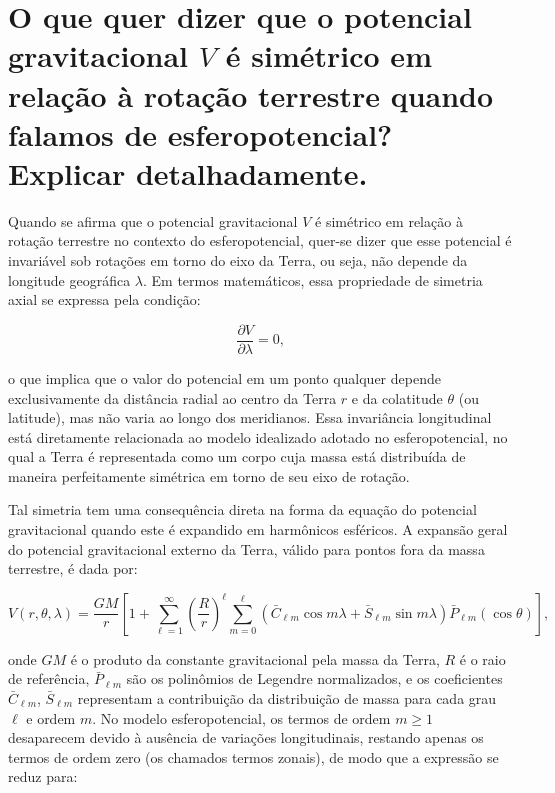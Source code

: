 
\section{O que quer dizer que o potencial gravitacional $V$ é simétrico em relação à rotação terrestre quando falamos de esferopotencial? Explicar detalhadamente.}

Quando se afirma que o potencial gravitacional \( V \) é simétrico em relação à rotação terrestre no contexto do esferopotencial, quer-se dizer que esse potencial é invariável sob rotações em torno do eixo da Terra, ou seja, não depende da longitude geográfica \( \lambda \). Em termos matemáticos, essa propriedade de simetria axial se expressa pela condição:

\[  
\frac{\partial V}{\partial \lambda} = 0 \text{,}
\]

\noindent
o que implica que o valor do potencial em um ponto qualquer depende exclusivamente da distância radial ao centro da Terra \( r \) e da colatitude \( \theta \) (ou latitude), mas não varia ao longo dos meridianos. Essa invariância longitudinal está diretamente relacionada ao modelo idealizado adotado no esferopotencial, no qual a Terra é representada como um corpo cuja massa está distribuída de maneira perfeitamente simétrica em torno de seu eixo de rotação.

Tal simetria tem uma consequência direta na forma da equação do potencial gravitacional quando este é expandido em harmônicos esféricos. A expansão geral do potencial gravitacional externo da Terra, válido para pontos fora da massa terrestre, é dada por:

\[
V(r, \theta, \lambda) = \frac{GM}{r} \left[1 + \sum_{\ell=1}^{\infty} \left( \frac{R}{r} \right)^\ell \sum_{m=0}^\ell \left( \bar{C}_{\ell m} \cos m\lambda + \bar{S}_{\ell m} \sin m\lambda \right) \bar{P}_{\ell m}(\cos \theta) \right] \text{,}
\]

\noindent
onde \( GM \) é o produto da constante gravitacional pela massa da Terra, \( R \) é o raio de referência, \( \bar{P}_{\ell m} \) são os polinômios de Legendre normalizados, e os coeficientes \( \bar{C}_{\ell m} \), \( \bar{S}_{\ell m} \) representam a contribuição da distribuição de massa para cada grau \( \ell \) e ordem \( m \). No modelo esferopotencial, os termos de ordem \( m \geq 1 \) desaparecem devido à ausência de variações longitudinais, restando apenas os termos de ordem zero (os chamados termos zonais), de modo que a expressão se reduz para:

